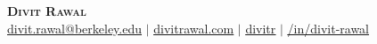 \begin{center}
    \textbf{\Huge \scshape Divit Rawal} \\ \vspace{1pt}
    \faEnvelope{} \href{mailto:divit.rawal@berkeley.edu}{\underline{divit.rawal@berkeley.edu}} $|$ 
    \faGlobe{} \href{https://www.divitrawal.com}{\underline{divitrawal.com}} $|$
    \faGithub{} \href{https://www.github.com/divitr}{\underline{divitr}} $|$
    \faLinkedin{} \href{https://www.linkedin.com/in/divit-rawal}{\underline{/in/divit-rawal}}
\end{center}